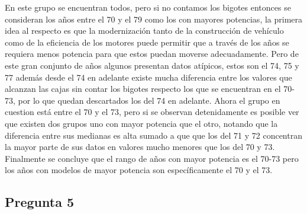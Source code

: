 \documentclass[letter,10pt]{article}
\begin{document}
En este grupo se encuentran todos, pero si no contamos los bigotes entonces se consideran los años
entre el 70 y el 79 como los con mayores potencias, la primera idea al respecto es que la modernización tanto de la construcción
de vehículo como de la eficiencia de los motores puede permitir que a través de los años se requiera menos potencia para que estos
puedan moverse adecuadamente. Pero de este gran conjunto de años algunos presentan datos atípicos, estos son el 74, 75 y 77 además desde el 74 en adelante existe
mucha diferencia entre los valores que alcanzan las cajas sin contar los bigotes respecto los que se encuentran en el 70-73, por lo que quedan descartados los del 74 en adelante.
Ahora el grupo en cuestion está entre el 70 y el 73, pero si se observan detenidamente es posible ver que existen dos grupos uno con mayor potencia que el otro, 
notando que la diferencia entre sus medianas es alta sumado a que que los del 71 y 72
concentran la mayor parte de sus datos en valores mucho menores que los del 70 y 73.
Finalmente se concluye que el rango de años con mayor potencia es el 70-73 pero los años con modelos de mayor potencia son específicamente el 70 y el 73.

\newpage
\subsection{Pregunta 5}
\end{document}
